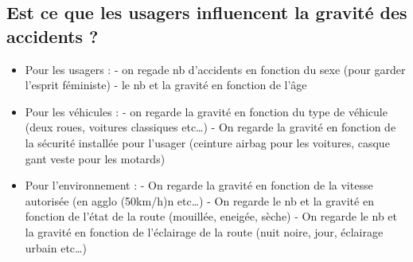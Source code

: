 \documentclass[
]{article}
\begin{document}
\hypertarget{est-ce-que-les-usagers-influencent-la-gravituxe9-des-accidents}{%
\subsection{Est ce que les usagers influencent la gravité des accidents
?}\label{est-ce-que-les-usagers-influencent-la-gravituxe9-des-accidents}}

\begin{itemize}
\item
  Pour les usagers : - on regade nb d'accidents en fonction du sexe
  (pour garder l'esprit féministe) - le nb et la gravité en fonction de
  l'âge
\item
  Pour les véhicules : - on regarde la gravité en fonction du type de
  véhicule (deux roues, voitures classiques etc\ldots) - On regarde la
  gravité en fonction de la sécurité installée pour l'usager (ceinture
  airbag pour les voitures, casque gant veste pour les motards)
\item
  Pour l'environnement : - On regarde la gravité en fonction de la
  vitesse autorisée (en agglo (50km/h)n etc\ldots) - On regarde le nb et
  la gravité en fonction de l'état de la route (mouillée, eneigée,
  sèche) - On regarde le nb et la gravité en fonction de l'éclairage de
  la route (nuit noire, jour, éclairage urbain etc\ldots)
\end{itemize}
\end{document}
